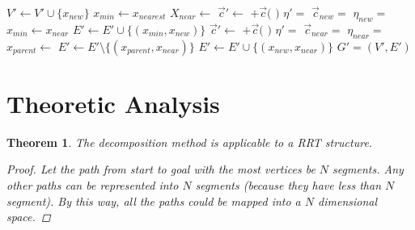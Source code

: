 \documentclass[conference]{IEEEtran}
\newtheorem{thm}{Theorem}
\begin{document}
\begin{algorithm}
\begin{algorithmic}[1]
\State $ V' \leftarrow V' \cup \{ x_{new} \} $
\State $ x_{min} \leftarrow x_{nearest} $
\State $ X_{near} \leftarrow $ 
		\State $ \vec{c}' \leftarrow $  $ + \vec{c}( $  $ ) $ 
		\State $ \eta' =  $ 
		\State $ \vec{c}_{new} = $  
		\State $ \eta_{new} = $ 
			\State $ x_{min} \leftarrow x_{near} $
		\EndIf
	\EndIf
\EndFor
\State $ E' \leftarrow E' \cup \{ ( x_{min}, x_{new} ) \} $
		\State $ \vec{c}' \leftarrow $  $ + \vec{c}( $  $ ) $ 
		\State $ \eta' =  $ 
		\State $ \vec{c}_{near} = $  
		\State $ \eta_{near} = $ 
			\State $ x_{parent} \leftarrow $ 
			\State $ E' \leftarrow E' \setminus \{ ( x_{parent}, x_{near} ) \} $
			\State $ E' \leftarrow E' \cup \{ ( x_{new}, x_{near} ) \} $
		\EndIf
	\EndIf
\EndFor
\Return $ G' = (V', E') $ 
\end{algorithmic}
\label{alg:morrtstar:extend:sub}
\caption{ $ \mbox{Extend}_{Sub} (G, x) $}
\end{algorithm} 


\section{Theoretic Analysis}
\label{sec:theoretic_analysis}

\begin{thm}
	\label{thm:moo-d:rrt}
	The decomposition method is applicable to a RRT structure.
	\begin{proof}
		Let the path from start to goal with the most vertices be $ N $ segments.
		Any other paths can be represented into $ N $ segments (because they have less than $ N $ segment).
		By this way, all the paths could be mapped into a $ N $ dimensional space.
	\end{proof}
\end{thm}
\end{document}
